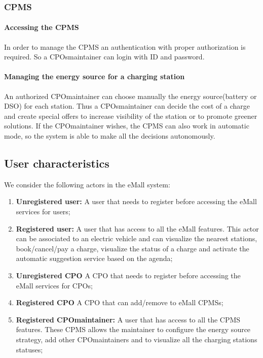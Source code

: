 \subsubsection{\ac{CPMS}}
\paragraph{Accessing the \ac{CPMS}}
In order to manage the \ac{CPMS} an authentication with proper authorization is required. So a \acp{CPO}maintainer can login with ID and password.

\paragraph{Managing the energy source for a charging station}
An authorized \ac{CPO}maintainer can choose manually the energy source(battery or \ac{DSO}) for each station.
Thus a \acp{CPO}maintainer can decide the cost of a charge and create special offers to increase visibility of the station or to promote greener solutions. If the \ac{CPO}maintainer wishes, the \ac{CPMS} can also work in automatic mode, so the system is able to make all the decisions autonomously.


\subsection{User characteristics}
We consider the following actors in the \ac{eMall} system:
\begin{enumerate}[label=\textbf{A\arabic*}]
      \item \textbf{Unregistered user:} A user that needs to register before accessing the \ac{eMall} services for users;
      \item \textbf{Registered user:} A user that has access to all the \ac{eMall} features.
            This actor can be associated to an electric vehicle and can visualize the nearest stations, book/cancel/pay a charge, visualize the status of a charge and activate the automatic suggestion service based on the agenda;
      \item \textbf{Unregistered \ac{CPO}} A \ac{CPO} that needs to register before accessing the \ac{eMall} services for \acp{CPO};
      \item \textbf{Registered \ac{CPO}} A \ac{CPO} that can add/remove to \ac{eMall} \acp{CPMS};
      \item \textbf{Registered \ac{CPO}maintainer:} A user that has access to all the \ac{CPMS} features.
            These \ac{CPMS} allows the maintainer to configure the energy source strategy, add other \ac{CPO}maintainers and to visualize all the charging stations statuses;
\end{enumerate}

